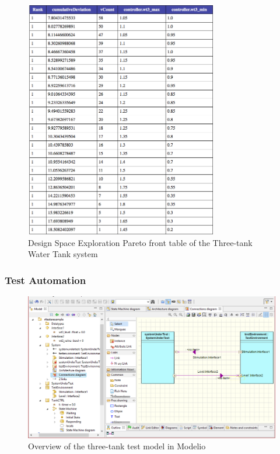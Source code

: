 \begin{figure}[h]
\begin{center}
\includegraphics[width=0.75\textwidth]{threetank/dse_results_table_nds.png}
\caption{Design Space Exploration Pareto front table of the Three-tank Water Tank system}
\label{fig:threetankdsetable}
\end{center}
\end{figure}


\subsubsection{Test Automation}
\label{sec:threetank_ta}

\begin{figure}
\begin{center}  
\includegraphics[width=\textwidth]{threetank/ta_overview}
\caption{Overview of the three-tank test model in Modelio}
\label{fig:threetanktestmodel}
\end{center}
\end{figure}

